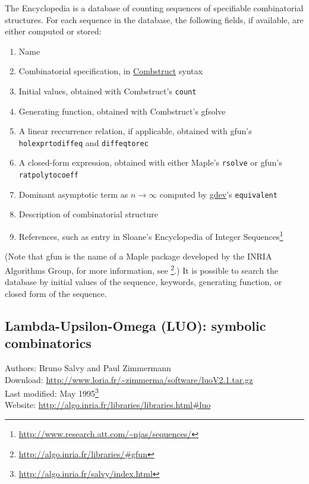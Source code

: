 \documentclass[12pt]{article}
\theoremstyle{plain}
\newcommand{\codefont}[1]{{\fontshape{n}\texttt{#1}}}
\begin{document}
The Encyclopedia is a database of counting sequences of specifiable combinatorial structures.
For each sequence in the database, the following fields, if available, are either computed or stored:
\begin{enumerate}
\item Name
\item Combinatorial specification, in \hyperref[sec:combstruct]{Combstruct} syntax
\item Initial values, obtained with Combstruct's \codefont{count}
\item Generating function, obtained with Combstruct's gfsolve
\item A linear reccurrence relation, if applicable, obtained with gfun's \codefont{holexprtodiffeq} and \codefont{diffeqtorec}
\item \sloppy A closed-form expression, obtained with either Maple's \codefont{rsolve} or gfun's \codefont{ratpolytocoeff}
\item Dominant asymptotic term as \( n \rightarrow \infty \) computed by \hyperref[sec:gdev]{gdev}'s \codefont{equivalent}
\item Description of combinatorial structure
\item References, such as entry in Sloane's Encyclopedia of Integer Sequences\footnote{
 \url{http://www.research.att.com/~njas/sequences/}
}
\end{enumerate}
(Note that gfun is the name of a Maple package developed by the INRIA Algorithms Group, for more information, see \footnote{
 \url{http://algo.inria.fr/libraries/\#gfun}
}.)
It is possible to search the database by initial values of the sequence, keywords, generating function, or closed form of the sequence.





\subsection{Lambda-Upsilon-Omega (LUO): symbolic combinatorics}
\label{sec:alas}

Authors: Bruno Salvy and Paul Zimmermann
\\
Download: \url{http://www.loria.fr/~zimmerma/software/luoV2.1.tar.gz}
\\
Last modified: May 1995\footnote{
 \url{http://algo.inria.fr/salvy/index.html}
}
\\
Website: \url{http://algo.inria.fr/libraries/libraries.html\#luo}
\\
\end{document}

